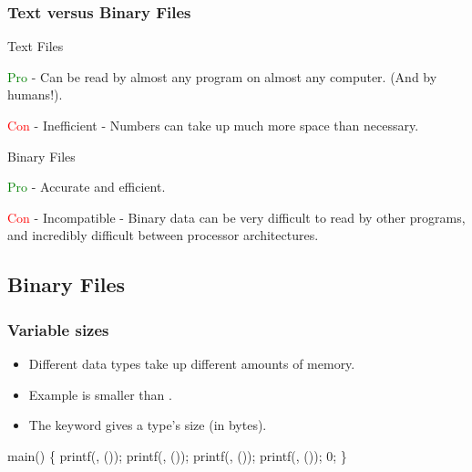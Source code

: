 \documentclass[smaller,handout,table]{beamer}
\begin{document}
\begin{frame}
\frametitle{Text versus Binary Files}
\begin{block}{Text Files}
\begin{itemize}
{
\item \textcolor{green}{Pro} - Can be read by almost any program on almost any computer. (And by humans!).
}
{
\item \textcolor{red}{Con} - Inefficient - Numbers can take up much more space than necessary.}
\end{itemize}
\end{block}

\begin{block}{Binary Files}
\begin{itemize}
{
\item \textcolor{green}{Pro} - Accurate and efficient.
}
{
\item \textcolor{red}{Con} - Incompatible - Binary data can be very difficult to read by other programs, and incredibly difficult between processor architectures.}
\end{itemize}
\end{block}
\end{frame}

\subsection{Binary Files}
\begin{frame}[fragile]
\frametitle{Variable sizes}
\begin{itemize}
\item Different data types take up different amounts of memory.
\item Example  is smaller than .
\item The  keyword gives a type's size (in bytes).
\end{itemize}

{
\small
\begin{semiverbatim}
 

 main()
\{
   printf(, ());
   printf(, ());
   printf(, ());
   printf(, ());
    0;
\}
\end{semiverbatim}
}
\end{frame}
\end{document}
